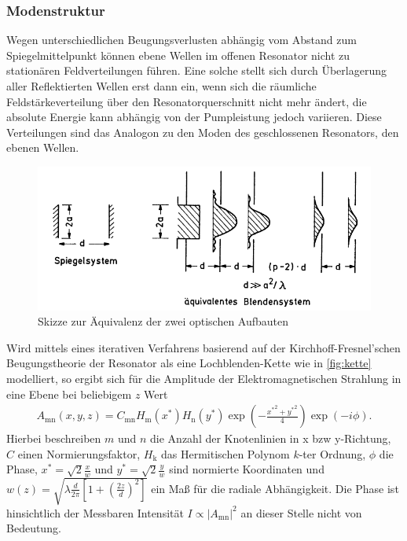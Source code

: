 \subsubsection{Modenstruktur}
Wegen unterschiedlichen Beugungsverlusten abhängig vom Abstand zum Spiegelmittelpunkt können ebene Wellen im offenen Resonator nicht zu stationären Feldverteilungen führen. Eine solche stellt sich durch Überlagerung aller Reflektierten Wellen erst dann ein, wenn sich die räumliche Feldstärkeverteilung über den Resonatorquerschnitt nicht mehr ändert, die absolute Energie kann abhängig von der Pumpleistung jedoch variieren. Diese Verteilungen sind das Analogon zu den Moden des geschlossenen Resonators, den ebenen Wellen.
\begin{figure}[H]
    \centering
    \includegraphics[scale=0.7]{Ressourcen/kette.png}
    \caption{Skizze zur Äquivalenz der zwei optischen Aufbauten\cite{Demtroeder}}\label{fig:kette}
\end{figure}
Wird mittels eines iterativen Verfahrens basierend auf der Kirchhoff-Fresnel'schen Beugungstheorie der Resonator als eine Lochblenden-Kette  wie in \autoref{fig:kette} modelliert, so ergibt sich für die Amplitude der Elektromagnetischen Strahlung in eine Ebene bei beliebigem $z$ Wert
\begin{align}
    A_\text{mn}(x,y,z)=C_\text{mn}H_\text{m}(x^*)H_\text{n}(y^*)\exp{\left(-\frac{{x^*}^2+{y^*}^2}{4}\right)}\exp{(-i\phi)}\text{.}
\end{align}
Hierbei beschreiben $m$ und $n$ die Anzahl der Knotenlinien in x bzw y-Richtung, $C$ einen Normierungsfaktor, $H_\text{k}$ das Hermitischen Polynom $k$-ter Ordnung, $\phi$ die Phase, $x^*=\sqrt{2}\frac{x}{w}$ und $y^*=\sqrt{2}\frac{y}{w}$ sind normierte Koordinaten und $w(z)=\sqrt{\lambda\frac{d}{2\pi}{\left[1+\left(\frac{2z}{d}\right)^2\right]}}$ ein Maß für die radiale Abhängigkeit. Die Phase ist hinsichtlich der Messbaren Intensität $I\propto|A_\text{mn}|^2$ an dieser Stelle nicht von Bedeutung.
